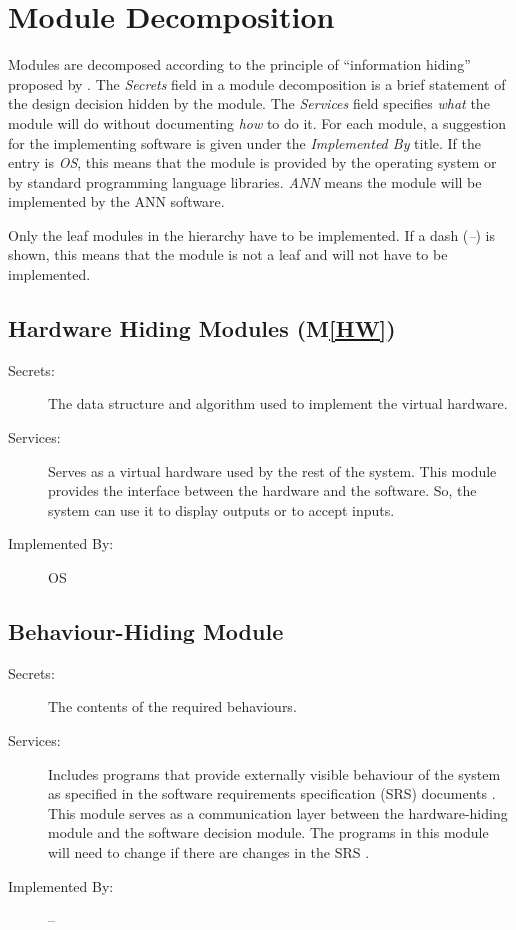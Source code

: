 \documentclass[12pt, titlepage]{article}
\newcommand{\mref}[1]{M\ref{#1}}
\begin{document}
\section{Module Decomposition} \label{SecMD}

Modules are decomposed according to the principle of ``information hiding''
proposed by \citet{ParnasEtAl1984}. The \emph{Secrets} field in a module
decomposition is a brief statement of the design decision hidden by the
module. The \emph{Services} field specifies \emph{what} the module will do
without documenting \emph{how} to do it. For each module, a suggestion for the
implementing software is given under the \emph{Implemented By} title. If the
entry is \emph{OS}, this means that the module is provided by the operating
system or by standard programming language libraries.  \emph{ANN} means the
module will be implemented by the ANN software.

Only the leaf modules in the hierarchy have to be implemented. If a dash
(\emph{--}) is shown, this means that the module is not a leaf and will not have
to be implemented.

\subsection{Hardware Hiding Modules (\mref{HW})}

\begin{description}
\item[Secrets:]The data structure and algorithm used to implement the virtual
  hardware.
\item[Services:]Serves as a virtual hardware used by the rest of the
  system. This module provides the interface between the hardware and the
  software. So, the system can use it to display outputs or to accept inputs.
\item[Implemented By:] OS
\end{description}

\subsection{Behaviour-Hiding Module}

\begin{description}
\item[Secrets:]The contents of the required behaviours.
\item[Services:]Includes programs that provide externally visible behaviour of
  the system as specified in the software requirements specification (SRS)
  documents \cite{SRS}. This module serves as a communication layer between the
  hardware-hiding module and the software decision module. The programs in this
  module will need to change if there are changes in the SRS \cite{SRS}.
\item[Implemented By:] --
\end{description}
\end{document}
